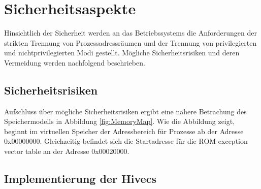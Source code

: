 \section{Sicherheitsaspekte}

Hinsichtlich der Sicherheit werden an das Betriebssystems die Anforderungen der strikten Trennung von Prozessadressräumen und der Trennung von privilegierten und nichtprivilegierten Modi gestellt. Mögliche Sicherheitsrisiken und deren Vermeidung werden nachfolgend beschrieben.

 

\subsection{Sicherheitsrisiken}

Aufschluss über mögliche Sicherheitsrisiken ergibt eine nähere Betrachung des Speichermodells in Abbildung \ref{fig:MemoryMap}. Wie die Abbildung zeigt, beginnt im virtuellen Speicher der Adressbereich für Prozesse ab der Adresse 0x00000000. Gleichzeitig befindet sich die Startadresse für die ROM exception vector table an der Adresse 0x00020000.


\subsection{Implementierung der Hivecs}

\pagebreak 